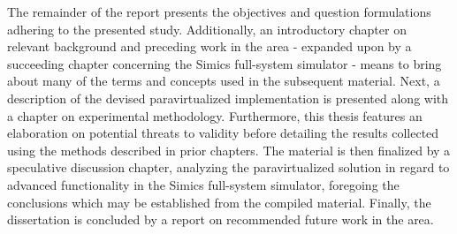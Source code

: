 The remainder of the report presents the objectives and question formulations adhering to the presented study.
Additionally, an introductory chapter on relevant background and preceding work in the area - expanded upon by a succeeding chapter concerning the Simics full-system simulator - means to bring about many of the terms and concepts used in the subsequent material.
Next, a description of the devised paravirtualized implementation is presented along with a chapter on experimental methodology.
Furthermore, this thesis features an elaboration on potential threats to validity before detailing the results collected using the methods described in prior chapters.
The material is then finalized by a speculative discussion chapter, analyzing the paravirtualized solution in regard to advanced functionality in the Simics full-system simulator, foregoing the conclusions which may be established from the compiled material.
Finally, the dissertation is concluded by a report on recommended future work in the area.
